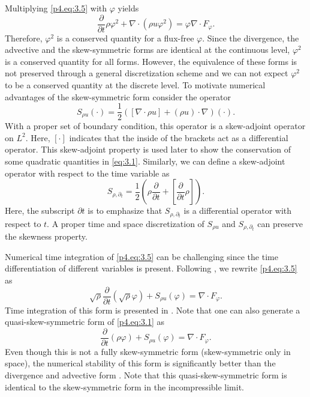 Multiplying \eqref{p4.eq:3.5} with $\varphi$ yields
\begin{equation}
	\frac{\partial }{\partial t} \rho \varphi^2 + \nabla \cdot ( \rho u \varphi^2  ) = \varphi \nabla \cdot F_{\varphi}.
\end{equation}
Therefore, $\varphi^2$ is a conserved quantity for a flux-free $\varphi$. Since the divergence, the advective and the skew-symmetric forms are identical at the continuous level, $\varphi^2$ is a conserved quantity for all forms. However, the equivalence of these forms is not preserved through a general discretization scheme and we can not expect $\varphi^2$ to be a conserved quantity at the discrete level. To motivate numerical advantages of the skew-symmetric form consider the operator 
\begin{equation}
	S_{\rho u}(\cdot) = \frac 1 2 ( [ \nabla \cdot \rho u ] + (\rho u)\cdot \nabla )(\cdot).
\end{equation}
With a proper set of boundary condition, this operator is a skew-adjoint operator on $L^2$. Here, $[\cdot]$ indicates that the inside of the brackets act as a differential operator. This skew-adjoint property is used later to show the conservation of some quadratic quantities in \eqref{eq:3.1}. Similarly, we can define a skew-adjoint operator with respect to the time variable as
\begin{equation}
	S_{\rho,\partial_t} = \frac{1}{2} \left( \rho \frac{\partial}{\partial t} + [ \frac{\partial}{\partial t} \rho] \right).
\end{equation}
Here, the subscript $\partial t$ is to emphasize that $S_{\rho,\partial_t}$ is a differential operator with respect to $t$. A proper time and space discretization of $S_{\rho u}$ and $S_{\rho,\partial_t}$ can preserve the skewness property.

Numerical time integration of \eqref{p4.eq:3.5} can be challenging since the time differentiation of different variables is present. Following \cite{morinishi2010skew}, we rewrite \eqref{p4.eq:3.5} as
\begin{equation} \label{p4.eq:3.6}
	\sqrt{\rho } \frac{\partial }{\partial t} (\sqrt \rho \varphi ) + S_{\rho u}(\varphi) = \nabla \cdot F_{\varphi}.
\end{equation}
Time integration of this form is presented in \cite{morinishi2010skew,reiss2014conservative}. Note that one can also generate a quasi-skew-symmetric form \cite{blaisdell1991numerical,morinishi2003dns} of \eqref{p4.eq:3.1} as
\begin{equation} \label{p4.eq:3.7}
	\frac{\partial }{\partial t} (\rho \varphi) + S_{\rho u}(\varphi) = \nabla \cdot F_{\varphi}.
\end{equation}
Even though this is not a fully skew-symmetric form (skew-symmetric only in space), the numerical stability of this form is significantly better than the divergence and advective form \cite{morinishi2010skew,blaisdell1991numerical,morinishi2003dns}. Note that this quasi-skew-symmetric form is identical to the skew-symmetric form in the incompressible limit.

